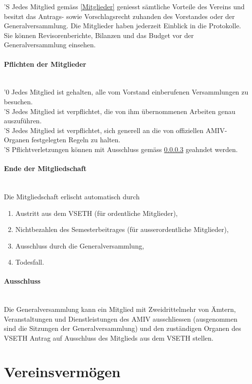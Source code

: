 \documentclass[a4paper,11pt]{article}
\newcommand{\nl}{\\[1.5ex]}
\begin{document}
'S Jedes Mitglied gemäss \ref{Mitglieder} geniesst sämtliche Vorteile des Vereins und besitzt das Antrags- sowie Vorschlagsrecht zuhanden des Vorstandes oder der Generalversammlung. Die Mitglieder haben jederzeit Einblick in die Protokolle. Sie können Revisorenberichte, Bilanzen und das Budget vor der Generalversammlung einsehen.


\paragraph{Pflichten der Mitglieder} \ \\
'0 Jedes Mitglied ist gehalten, alle vom Vorstand einberufenen Versammlungen zu besuchen.\nl
'S Jedes Mitglied ist verpflichtet, die von ihm übernommenen Arbeiten genau auszuführen.\nl
'S Jedes Mitglied ist verpflichtet, sich generell an die von offiziellen AMIV-Organen festgelegten Regeln zu halten.\nl
'S Pflichtverletzungen können mit Ausschluss gemäss \ref{Ausschuss} geahndet werden.


\paragraph{Ende der Mitgliedschaft} \ \\
Die Mitgliedschaft erlischt automatisch durch
\begin{enumerate}
  \item Austritt aus dem VSETH (für ordentliche Mitglieder),
  \item Nichtbezahlen des Semesterbeitrages (für ausserordentliche Mitglieder),
  \item Ausschluss durch die Generalversammlung,
  \item Todesfall.
\end{enumerate}


\paragraph{Ausschluss} \label{Ausschuss} \ \\
Die Generalversammlung kann ein Mitglied mit Zweidrittelmehr von Ämtern, Veranstaltungen und Dienstleistungen des AMIV ausschliessen (ausgenommen sind die Sitzungen der Generalversammlung) und den zuständigen Organen des VSETH Antrag auf Ausschluss des Mitglieds aus dem VSETH stellen.



\section{Vereinsvermögen}
\end{document}
